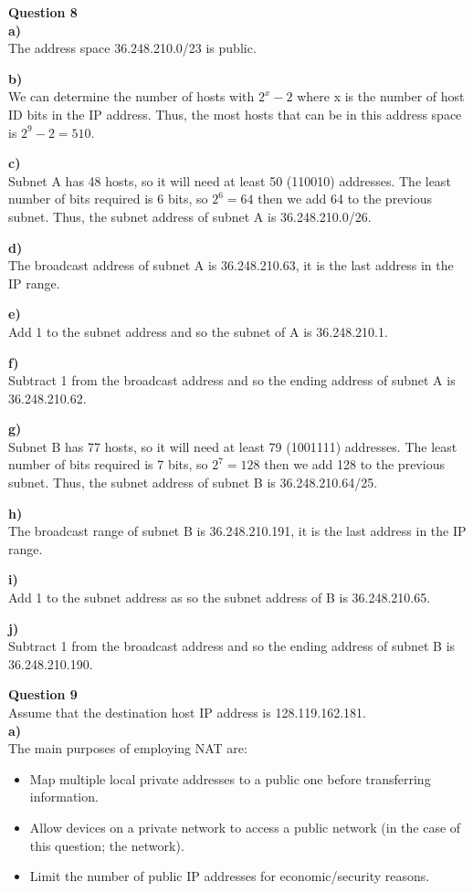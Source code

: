 \documentclass{article}
\begin{document}
\bigskip
{\bf Question 8}\\
{\bf a)}\\
The address space 36.248.210.0/23 is public.

{\bf b)}\\
We can determine the number of hosts with $2^x-2$ where x is the number of host ID bits in the IP address. Thus, the most hosts that can be in this address space is $2^9-2=510$.

{\bf c)}\\
Subnet A has 48 hosts, so it will need at least 50 (110010) addresses. The least number of bits required is 6 bits, so $2^6=64$ then we add 64 to the previous subnet. Thus, the subnet address of subnet A is 36.248.210.0/26.

{\bf d)}\\
The broadcast address of subnet A is 36.248.210.63, it is the last address in the IP range.

{\bf e)}\\
Add 1 to the subnet address and so the subnet of A is 36.248.210.1.

{\bf f)}\\
Subtract 1 from the broadcast address and so the ending address of subnet A is 36.248.210.62.

{\bf g)}\\
Subnet B has 77 hosts, so it will need at least 79 (1001111) addresses. The least number of bits required is 7 bits, so $2^7=128$ then we add 128 to the previous subnet. Thus, the subnet address of subnet B is 36.248.210.64/25.

{\bf h)}\\
The broadcast range of subnet B is 36.248.210.191, it is the last address in the IP range.

{\bf i)}\\
Add 1 to the subnet address as so the subnet address of B is 36.248.210.65.

{\bf j)}\\
Subtract 1 from the broadcast address and so the ending address of subnet B is 36.248.210.190.

\bigskip
{\bf Question 9}\\
Assume that the destination host IP address is 128.119.162.181.\\
{\bf a)}\\
The main purposes of employing NAT are:
\begin{itemize}
  \item Map multiple local private addresses to a public one before transferring
  information.
  \item Allow devices on a  private network to access a public network (in the case of this question; the network).
  \item Limit the number of public IP addresses for economic/security reasons.
\end{itemize}
\end{document}
